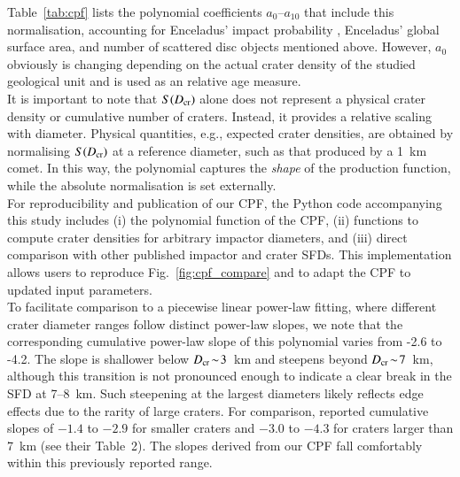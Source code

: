 \documentclass[preprint,11pt,3p,times,authoryear]{elsarticle}
\begin{document}
{Table~\ref{tab:cpf} lists the polynomial coefficients $a_{0}$–$a_{10}$ that include this normalisation, accounting for Enceladus’ impact probability \citep{Wong2023,Brasser2025}, Enceladus' global surface area, and number of scattered disc objects mentioned above. However, $a_{0}$ obviously is changing depending on the actual crater density of the studied geological unit and is used as an relative age measure.\\

It is important to note that $S(D_{\rm cr})$ alone does not represent a physical crater density or cumulative number of craters. Instead, it provides a relative scaling with diameter.
Physical quantities, e.g., expected crater densities, are obtained by normalising $S(D_{\rm cr})$ at a reference diameter, such as that produced by a 1~km comet.
In this way, the polynomial captures the \emph{shape} of the production function, while the absolute normalisation is set externally.\\

For reproducibility and publication of our CPF, the Python code accompanying this study includes (i) the polynomial function of the CPF, (ii) functions to compute crater densities for arbitrary impactor diameters, and (iii) direct comparison with other published impactor and crater SFDs. This implementation allows users to reproduce Fig.~\ref{fig:cpf_compare} and to adapt the CPF to updated input parameters.\\


To facilitate comparison to a piecewise linear power-law fitting, where different crater diameter ranges follow distinct power-law slopes, we note that the corresponding cumulative power-law slope of this polynomial varies from -2.6 to -4.2.
The slope is shallower below $D_{\rm cr}\!\sim\!3$~km and steepens beyond $D_{\rm cr}\!\sim\!7$~km, although this transition is not pronounced enough to indicate a clear break in the SFD at 7--8~km. Such steepening at the largest diameters likely reflects edge effects due to the rarity of large craters.
For comparison, \citet{Kirchoff2009} reported cumulative slopes of $-1.4$ to $-2.9$
for smaller craters and $-3.0$ to $-4.3$ for craters larger than 7~km (see their Table~2). The slopes derived from our CPF fall comfortably within this previously reported range.\\

}
\end{document}
